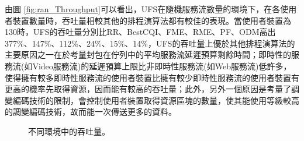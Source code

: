 由圖 \ref{fig:ran_Throughput}可以看出，UFS在隨機服務流數量的環境下，在各使用者裝置數量時，吞吐量相較其他的排程演算法都有較佳的表現。當使用者裝置為130時，UFS的吞吐量分別比RR、BestCQI、FME、RME、PF、ODM高出377\%、147\%、112\%、24\%、15\%、14\%，UFS的吞吐量上優於其他排程演算法的主要原因之一在於考量封包在佇列中的平均服務流延遲預算剩餘時間；即時性的服務流(如Video服務流)的延遲預算上限比非即時性服務流(如Web服務流)低許多，使得擁有較多即時性服務流的使用者裝置比擁有較少即時性服務流的使用者裝置有更高的機率先取得資源，因而能有較高的吞吐量；此外，另外一個原因是考量了調變編碼技術的限制，會控制使用者裝置取得資源區塊的數量，使其能使用等級較高的調變編碼技術，故而能一次傳送更多的資料。
\begin{figure}[H]
\centering
{}
\caption{\label{fig:Throughput}不同環境中的吞吐量。}
\end{figure}
